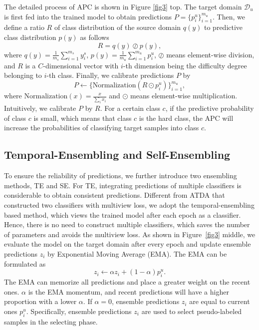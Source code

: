 \documentclass[a4paper,fleqn]{cas-dc}
\begin{document}
	The detailed process of APC is shown in Figure \ref{fig3} top. The target domain $\mathcal{D}_{u}$ is first fed into the trained model to obtain predictions $P = \{p_i^u\}_{i=1}^{m_u}$. Then, we define a ratio $R$ of class distribution of the source domain $q(y)$ to predictive class distribution $p(y)$ as follows
	\begin{equation}\label{eq1}
		R = q(y) \oslash p(y),
	\end{equation}
	where $q(y)=\frac{1}{m_s}\sum_{i=1}^{m_s}y_i^s$, $p(y)=\frac{1}{m_u}\sum_{i=1}^{m_u}p_i^u$, $\oslash$ means element-wise division, and $R$ is a $C$-dimensional vector with $i$-th dimension being the difficulty degree belonging to $i$-th class. Finally, we calibrate predictions $P$ by
	\begin{equation}\label{eq2}
		P \leftarrow \{\text{Normalization}(R \odot p_i^u)\}_{i=1}^{m_u},
	\end{equation}
	where $\text{Normalization}(x) = \frac{x}{\sum_i x_i}$ and $\odot$ means element-wise multiplication. Intuitively, we calibrate $P$ by $R$. For a certain class $c$, if the predictive probability of class $c$ is small, which means that class $c$ is the hard class,  the APC will increase the probabilities of classifying target samples into class $c$.
	
	
	\subsection{Temporal-Ensembling and Self-Ensembling}
	To ensure the reliability of predictions, we further introduce two ensembling methods, TE and SE. For TE, integrating predictions of multiple classifiers is considerable to obtain consistent predictions. Different from ATDA \cite{saito2017asymmetric} that constructed two classifiers with multiview loss, we adopt the temporal-ensembling based method, which views the trained model after each epoch as a classifier. Hence, there is no need to construct multiple classifiers, which saves the number of parameters and avoids the multiview loss. As shown in Figure~\ref{fig3} middle, we evaluate the model on the target domain after every epoch and update ensemble predictions $z_i$ by Exponential Moving Average (EMA). The EMA can be formulated as
	\begin{equation} \label{eq3}
		z_i \leftarrow \alpha z_i + (1-\alpha)p_i^u.
	\end{equation}
	The EMA can memorize all predictions and place a greater weight on the recent ones. $\alpha$ is the EMA momentum, and recent predictions will have a higher proportion with a lower $\alpha$. If $\alpha =0$, ensemble predictions $z_i$ are equal to current ones $p_i^u$. Specifically, ensemble predictions $z_i$ are used to select pseudo-labeled samples in the selecting phase.
	
\end{document}
